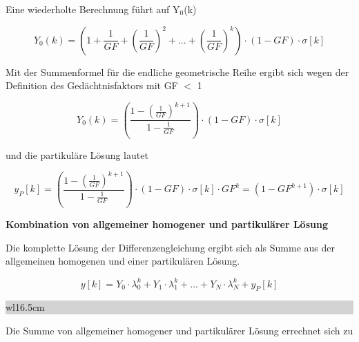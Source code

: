 \noindent Eine wiederholte Berechnung f\"{u}hrt auf Y${}_{0}$(k) 

\begin{equation}\label{eq:foursixtysix}
Y_{0} \left(k\right)=\left(1+\frac{1}{GF} +\left(\frac{1}{GF} \right)^{2} +...+\left(\frac{1}{GF} \right)^{k} \right)\cdot \left(1-GF\right)\cdot \sigma \left[k\right]
\end{equation}

\noindent Mit der Summenformel f\"{u}r die endliche geometrische Reihe ergibt sich wegen der Definition des Ged\"{a}chtnisfaktors mit {\textbar}GF{\textbar} $\mathrm{<}$ 1

\begin{equation}\label{eq:foursixtyseven}
Y_{0} \left(k\right)=\left(\frac{1-\left(\frac{1}{GF} \right)^{k+1} }{1-\frac{1}{GF} } \right)\cdot \left(1-GF\right)\cdot \sigma \left[k\right]
\end{equation}

\noindent und die partikul\"{a}re L\"{o}sung lautet

\begin{equation}\label{eq:foursixtyeight}
y_{P} \left[k\right]=\left(\frac{1-\left(\frac{1}{GF} \right)^{k+1} }{1-\frac{1}{GF} } \right)\cdot \left(1-GF\right)\cdot \sigma \left[k\right]\cdot GF^{k} =\left(1-GF^{k+1} \right)\cdot \sigma \left[k\right]
\end{equation}

\clearpage

{\selectfont
\noindent\textbf{ Kombination von allgemeiner homogener und partikul\"{a}rer L\"{o}sung}} \smallskip

\noindent Die komplette L\"{o}sung der Differenzengleichung ergibt sich als Summe aus der allgemeinen homogenen und einer partikul\"{a}ren L\"{o}sung. 

\begin{equation}\label{eq:foursixtynine}
y\left[k\right]=Y_{0} \cdot \lambda _{0}^{k} +Y_{1} \cdot \lambda _{1}^{k} +...+Y_{N} \cdot \lambda _{N}^{k} +y_{P} \left[k\right]
\end{equation}

\noindent
\colorbox{lightgray}{%
%
\renewcommand\arraystretch{0.6}%
\begin{tabular}{ wl{16.5cm} }
{}
\end{tabular}%
}\medskip

\noindent Die Summe von allgemeiner homogener und partikul\"{a}rer L\"{o}sung errechnet sich zu

